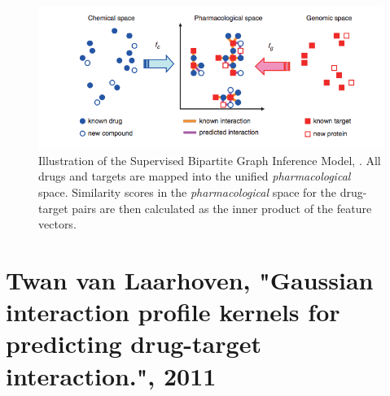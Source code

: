 \begin{figure}
\begin{center}
\includegraphics[scale=0.65]{yamanishi_related.png}
\end{center}
\caption[Illustration of Supervised Bipartite Graph Inference Method]{\large{Illustration of the Supervised Bipartite Graph Inference Model, \cite{yamanishi2008prediction}. All drugs and targets are mapped into the unified \textit{pharmacological} space. Similarity scores in the \textit{pharmacological} space for the drug-target pairs are then calculated as the inner product of the feature vectors.}}
\label{fig:yamanishi_1}
\end{figure}

\section{Twan van Laarhoven, "Gaussian interaction profile kernels for predicting drug-target interaction.", 2011}

